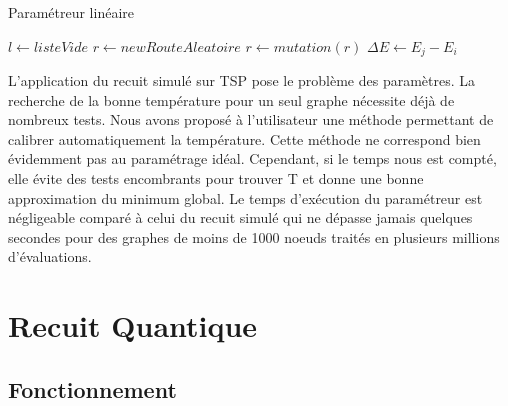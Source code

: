 \documentclass{article}%
\begin{document}
	\begin{algorithm}[!h] 
	\caption{Paramétreur linéaire}
	\begin{algorithmic}
	
	\STATE $ l \leftarrow{listeVide} $
		\STATE $ r \leftarrow{new RouteAleatoire} $
		\STATE $r \leftarrow mutation( r ) $
		\STATE $\Delta{E} \leftarrow E_j-E_i$
		\ENDIF
	\ENDFOR
	\end{algorithmic}
	\end{algorithm}
	
	L'application du recuit simulé sur TSP pose le problème des paramètres. La recherche de la bonne température pour un seul graphe nécessite déjà de nombreux tests. Nous avons proposé à l'utilisateur une méthode permettant de calibrer automatiquement la température. Cette méthode ne correspond bien évidemment pas au paramétrage idéal. Cependant, si le temps nous est compté, elle évite des tests encombrants pour trouver T et donne une bonne approximation du minimum global. Le temps d'exécution du paramétreur est négligeable comparé à celui du recuit simulé qui ne dépasse jamais quelques secondes pour des graphes de moins de 1000 noeuds traités en plusieurs millions d'évaluations.
	
	
\clearpage
\section{Recuit Quantique}
\subsection{Fonctionnement}

	\vspace{1cm}
	
\end{document}

